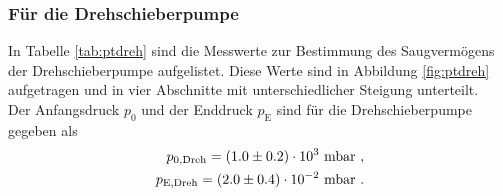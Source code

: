 \subsubsection{Für die Drehschieberpumpe}
In Tabelle \eqref{tab:ptdreh} sind die Messwerte zur Bestimmung des Saugvermögens der Drehschieberpumpe aufgelistet. Diese Werte sind in Abbildung \eqref{fig:ptdreh} aufgetragen und in vier Abschnitte mit unterschiedlicher Steigung unterteilt. \\
Der Anfangsdruck $p_0$ und der Enddruck $p_\text{E}$ sind für die Drehschieberpumpe gegeben als
\begin{align*}
  p_{0,\text{Dreh}} = (\num{1 +- 0.2})\cdot 10^3\ \text{mbar} \ , \\
  p_{\text{E},\text{Dreh}} = (\num{2 +- 0.4})\cdot 10^{-2}\ \text{mbar} \ .
\end{align*}


